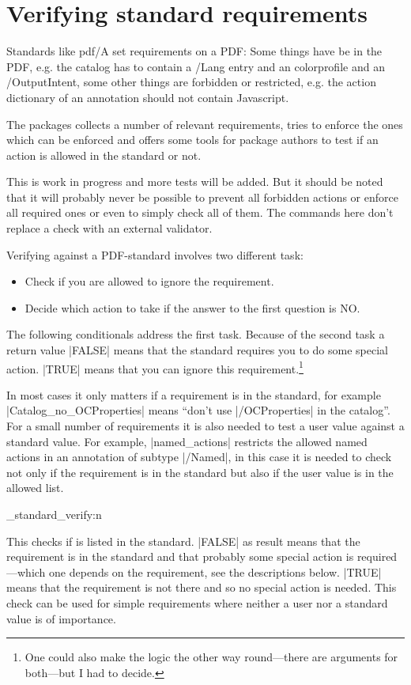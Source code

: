 \documentclass{l3doc}
\begin{document}
\section{Verifying standard requirements}

Standards like pdf/A set requirements on a PDF: Some things have be in the PDF, e.g. the catalog has to contain a /Lang entry and an colorprofile and an /OutputIntent, some other things are forbidden or restricted, e.g. the action dictionary of an annotation should not contain Javascript.

The  packages collects a number of relevant requirements, tries to enforce the ones which can be enforced and offers some tools for package authors to test if an action is allowed in the standard or not.

This is work in progress and more tests will be added. But it should be noted that it will probably never be possible to prevent all forbidden actions or enforce all required ones or even to simply check all of them. 
The commands here don't replace a check with an external validator.

Verifying against a PDF-standard involves two different task: 

\begin{itemize}
  \item Check if you are allowed to ignore the requirement. 
  \item Decide which action to take if the answer to the first question is NO.
\end{itemize}

The following conditionals address the first task. Because of the second task a return value |FALSE| means that the standard requires you to do some special action. |TRUE| means that you can ignore this requirement.\footnote{One could also make the logic the other way round---there are arguments for both---but I had to decide.}

In most cases it only matters if a requirement is in the standard, for example |Catalog_no_OCProperties| means \enquote{don't use |/OCProperties| in the catalog}. For a small number of requirements it is also needed to test a user value against a standard value. For example, |named_actions| restricts the allowed named actions in an annotation of subtype |/Named|, in this case it is needed to
check not only if the requirement is in the standard but also if the user value is in the allowed list.

\begin{function}{\pdfmeta_standard_verify:n}
\begin{syntax}
\end{syntax}

This checks if  is listed in the standard. |FALSE| as result means that the requirement is in the standard and that probably some special action is required---which one depends on the requirement, see the descriptions below.
|TRUE| means that the requirement is not there and so no special action is needed.
This check can be used for simple requirements where neither a user nor a standard value is of importance.
\end{function}
\end{document}
